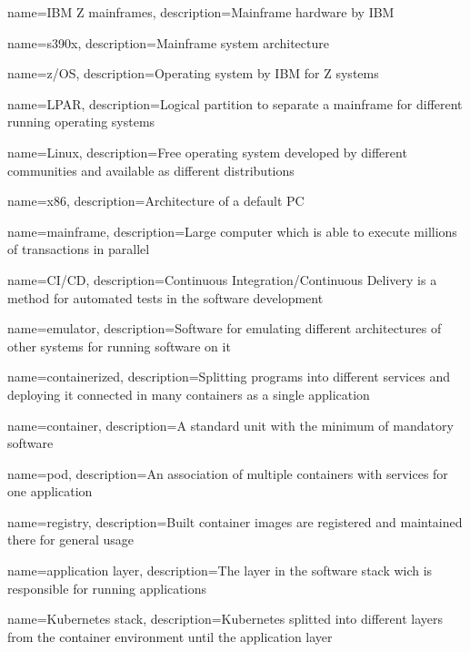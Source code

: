 {
    name={IBM Z mainframes},
    description={Mainframe hardware by IBM}
}

{
    name={s390x},
    description={Mainframe system architecture}
}

{
    name={z/OS},
    description={Operating system by IBM for Z systems}
}

{
    name={LPAR},
    description={Logical partition to separate a mainframe for different running operating systems}
}

{
    name={Linux},
    description={Free operating system developed by different communities and available as different distributions}
}

{
    name={x86},
    description={Architecture of a default PC}
}


{
    name={mainframe},
    description={Large computer which is able to execute millions of transactions in parallel}
}


{
    name={CI/CD},
    description={Continuous Integration/Continuous Delivery is a method for automated tests in the software development}
}

{
    name={emulator},
    description={Software for emulating different architectures of other systems for running software on it}
}

{
    name={containerized},
    description={Splitting programs into different services and deploying it connected in many containers as a single application}
}

{
    name={container},
    description={A standard unit with the minimum of mandatory software}
}

{
    name={pod},
    description={An association of multiple containers with services for one application}
}

{
    name={registry},
    description={Built container images are registered and maintained there for general usage}
}

{
    name={application layer},
    description={The layer in the software stack wich is responsible for running applications}
}

{
    name={Kubernetes stack},
    description={Kubernetes splitted into different layers from the container environment until the application layer}
}

